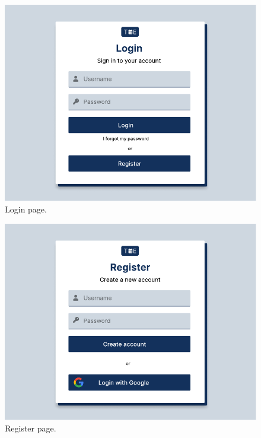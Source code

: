 \documentclass[9pt]{extarticle}
\begin{document}
\begin{figure}[!htb]
	\centering
	\includegraphics[width=.7\linewidth]{./images/Login.pdf}
	\caption{Login page.}
	\label{fig:login}
\end{figure}


\begin{figure}[!htb]
	\centering
	\includegraphics[width=.7\linewidth]{./images/Register.pdf}
	\caption{Register page.}
	\label{fig:register}
\end{figure}
\end{document}
